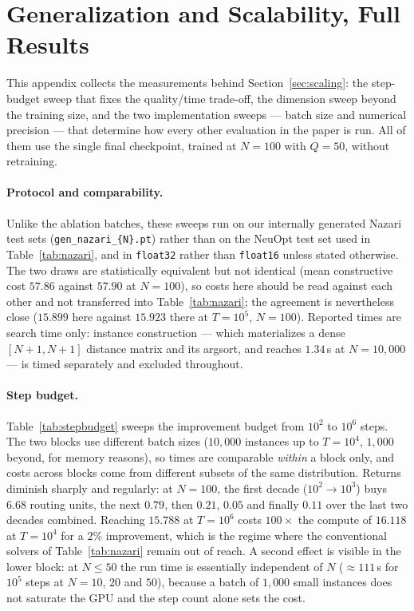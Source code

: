 \documentclass[letterpaper]{article} %
\begin{document}
\section{Generalization and Scalability, Full Results}
\label{app:scaling}

This appendix collects the measurements behind Section~\ref{sec:scaling}: the step-budget sweep that fixes the quality/time trade-off, the dimension sweep beyond the training size, and the two implementation sweeps --- batch size and numerical precision --- that determine how every other evaluation in the paper is run. All of them use the single final checkpoint, trained at $N = 100$ with $Q = 50$, without retraining.

\paragraph{Protocol and comparability.}
Unlike the ablation batches, these sweeps run on our internally generated Nazari test sets (\texttt{gen\_nazari\_\{N\}.pt}) rather than on the NeuOpt test set used in Table~\ref{tab:nazari}, and in \texttt{float32} rather than \texttt{float16} unless stated otherwise. The two draws are statistically equivalent but not identical (mean constructive cost $57.86$ against $57.90$ at $N = 100$), so costs here should be read against each other and not transferred into Table~\ref{tab:nazari}; the agreement is nevertheless close ($15.899$ here against $15.923$ there at $T = 10^{5}$, $N = 100$). Reported times are search time only: instance construction --- which materializes a dense $[N{+}1, N{+}1]$ distance matrix and its argsort, and reaches $1.34$\,s at $N = 10{,}000$ --- is timed separately and excluded throughout.

\paragraph{Step budget.}
Table~\ref{tab:stepbudget} sweeps the improvement budget from $10^{2}$ to $10^{6}$ steps. The two blocks use different batch sizes ($10{,}000$ instances up to $T = 10^{4}$, $1{,}000$ beyond, for memory reasons), so times are comparable \emph{within} a block only, and costs across blocks come from different subsets of the same distribution. Returns diminish sharply and regularly: at $N = 100$, the first decade ($10^{2} \to 10^{3}$) buys $6.68$ routing units, the next $0.79$, then $0.21$, $0.05$ and finally $0.11$ over the last two decades combined. Reaching $15.788$ at $T = 10^{6}$ costs $100\times$ the compute of $16.118$ at $T = 10^{4}$ for a $2\%$ improvement, which is the regime where the conventional solvers of Table~\ref{tab:nazari} remain out of reach. A second effect is visible in the lower block: at $N \le 50$ the run time is essentially independent of $N$ ($\approx 111$\,s for $10^{5}$ steps at $N = 10$, $20$ and $50$), because a batch of $1{,}000$ small instances does not saturate the GPU and the step count alone sets the cost.
\end{document}
